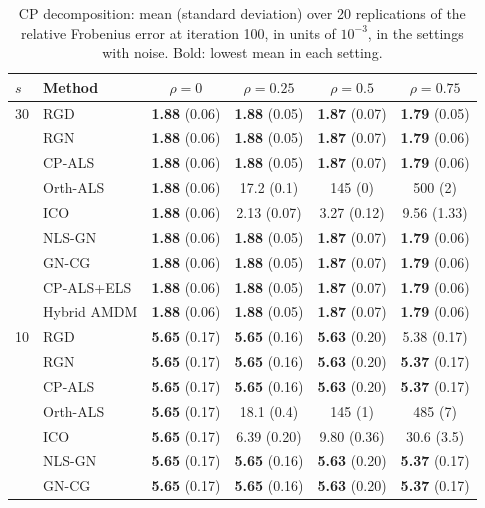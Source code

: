 \begin{table}[!htbp]
\centering
\caption{CP decomposition: mean (standard deviation) over 20 replications of the relative Frobenius error at iteration 100, in units of $10^{-3}$, in the settings with noise. Bold: lowest mean in each setting.}
\label{tab:decomposition_errors}
{\small
\begin{tabular}{llcccc}
\toprule
$s$ & Method & $\rho=0$ & $\rho=0.25$ & $\rho=0.5$ & $\rho=0.75$ \\
\midrule
30 & RGD & \textbf{1.88} (0.06) & \textbf{1.88} (0.05) & \textbf{1.87} (0.07) & \textbf{1.79} (0.05) \\
 & RGN & \textbf{1.88} (0.06) & \textbf{1.88} (0.05) & \textbf{1.87} (0.07) & \textbf{1.79} (0.06) \\
 & CP-ALS & \textbf{1.88} (0.06) & \textbf{1.88} (0.05) & \textbf{1.87} (0.07) & \textbf{1.79} (0.06) \\
 & Orth-ALS & \textbf{1.88} (0.06) & 17.2 (0.1) & 145 (0) & 500 (2) \\
 & ICO & \textbf{1.88} (0.06) & 2.13 (0.07) & 3.27 (0.12) & 9.56 (1.33) \\
 & NLS-GN & \textbf{1.88} (0.06) & \textbf{1.88} (0.05) & \textbf{1.87} (0.07) & \textbf{1.79} (0.06) \\
 & GN-CG & \textbf{1.88} (0.06) & \textbf{1.88} (0.05) & \textbf{1.87} (0.07) & \textbf{1.79} (0.06) \\
 & CP-ALS+ELS & \textbf{1.88} (0.06) & \textbf{1.88} (0.05) & \textbf{1.87} (0.07) & \textbf{1.79} (0.06) \\
 & Hybrid AMDM & \textbf{1.88} (0.06) & \textbf{1.88} (0.05) & \textbf{1.87} (0.07) & \textbf{1.79} (0.06) \\
\midrule
10 & RGD & \textbf{5.65} (0.17) & \textbf{5.65} (0.16) & \textbf{5.63} (0.20) & 5.38 (0.17) \\
 & RGN & \textbf{5.65} (0.17) & \textbf{5.65} (0.16) & \textbf{5.63} (0.20) & \textbf{5.37} (0.17) \\
 & CP-ALS & \textbf{5.65} (0.17) & \textbf{5.65} (0.16) & \textbf{5.63} (0.20) & \textbf{5.37} (0.17) \\
 & Orth-ALS & \textbf{5.65} (0.17) & 18.1 (0.4) & 145 (1) & 485 (7) \\
 & ICO & \textbf{5.65} (0.17) & 6.39 (0.20) & 9.80 (0.36) & 30.6 (3.5) \\
 & NLS-GN & \textbf{5.65} (0.17) & \textbf{5.65} (0.16) & \textbf{5.63} (0.20) & \textbf{5.37} (0.17) \\
 & GN-CG & \textbf{5.65} (0.17) & \textbf{5.65} (0.16) & \textbf{5.63} (0.20) & \textbf{5.37} (0.17) \\

\end{tabular}}
\end{table}
